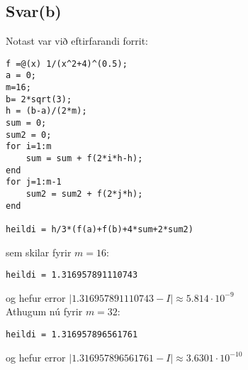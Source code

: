 \documentclass[11pt]{article}
\begin{document}
\subsection*{Svar(b)}
Notast var við eftirfarandi forrit:
\begin{verbatim}
f =@(x) 1/(x^2+4)^(0.5);
a = 0;
m=16;
b= 2*sqrt(3);
h = (b-a)/(2*m);
sum = 0;
sum2 = 0;
for i=1:m
    sum = sum + f(2*i*h-h);
end
for j=1:m-1
    sum2 = sum2 + f(2*j*h);
end

heildi = h/3*(f(a)+f(b)+4*sum+2*sum2)
\end{verbatim}
sem skilar fyrir $m=16$:
\begin{verbatim}
heildi = 1.316957891110743
\end{verbatim}
og hefur error $|1.316957891110743 - I| \approx 5.814\cdot 10^{-9}$\\
Athugum nú fyrir $m=32$:
\begin{verbatim}
heildi = 1.316957896561761
\end{verbatim}
og hefur error $|1.316957896561761 - I| \approx 3.6301\cdot 10^{-10}$
\end{document}
